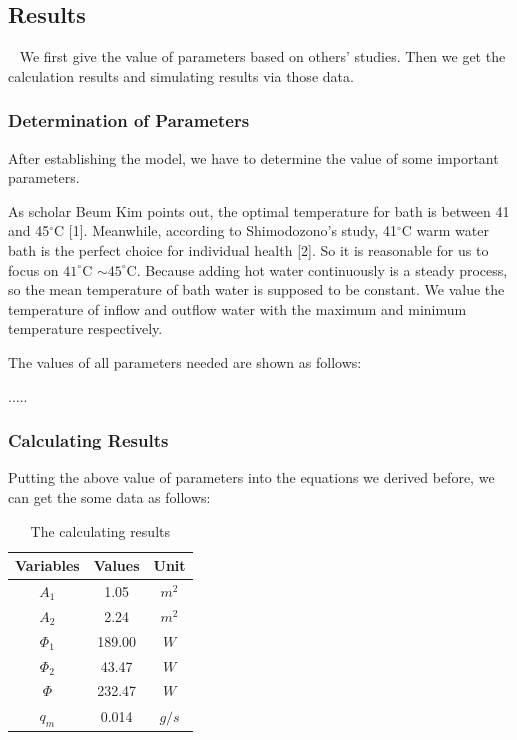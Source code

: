 \documentclass{mcmthesis}
\begin{document}
\subsection{Results}

\quad~ We first give the value of parameters based on others’ studies. Then we get the calculation results and simulating results via those data.

\subsubsection{Determination of Parameters}

After establishing the model, we have to determine the value of some
important parameters.

As scholar Beum Kim points out, the optimal temperature for bath is
between 41 and 45$^\circ$C [1]. Meanwhile, according to Shimodozono's study, 41$^\circ$C warm water bath is the perfect choice for individual health [2]. So it is reasonable for us to focus on $41^\circ$C $\sim 45^\circ$C. Because adding hot water continuously is a steady process, so the mean temperature of bath water is supposed to be constant. We value the temperature of inflow and outflow water with the maximum and minimum temperature respectively.

The values of all parameters needed are shown as follows:

.....

\subsubsection{Calculating Results}

Putting the above value of parameters into the equations we derived before, we can get the some data as follows:

\begin{table}[h]  %
\centering        %
\caption{The calculating results}  %
\vspace{0.15cm}
\label{tab2}                       %
\begin{tabular}{|c|c|c|}  %
\hline                    %
Variables & Values & Unit     \\ \hline  %
$A_1$     & 1.05   &   $m^2$  \\ \hline
$A_2$     & 2.24   &   $m^2$  \\ \hline
$\Phi_1$  & 189.00 &   $W$   \\ \hline
$\Phi_2$  & 43.47  &   $W$   \\ \hline
$\Phi$    & 232.47 &   $W$   \\ \hline
$q_m$     & 0.014  &   $g/s$ \\ \hline
\end{tabular}
\end{table}
\end{document}
